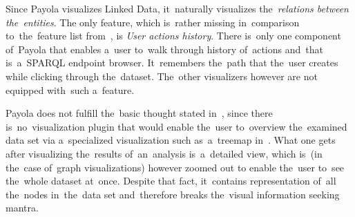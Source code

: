 Since Payola visualizes Linked Data, it~naturally visualizes the~\emph{relations between the~entities}.
The only feature, which is~rather missing in~comparison to~the~feature list from~\cite{mantra}, is
\emph{User actions history}.
There is~only one component of~Payola that enables a~user to~walk through 
history of~actions and~that is~a~SPARQL endpoint browser. It~remembers the~path 
that the~user creates while clicking through the~dataset. The~other visualizers 
however are not equipped with~such a~feature.

Payola does not fulfill the~basic thought stated in~\cite{mantra}, since 
there is~no~visualization plugin that would enable the~user to~overview the~examined data set via a~specialized visualization such as~a~treemap 
in~\cite{lodvis}. What one gets after visualizing the~results of~an~analysis is~a~detailed view, which is~(in the~case of~graph visualizations) however zoomed out
to enable the~user to~see the~whole dataset at~once. Despite that fact, it~contains representation of~all the~nodes in~the~data set and~therefore breaks 
the~visual information seeking mantra.
